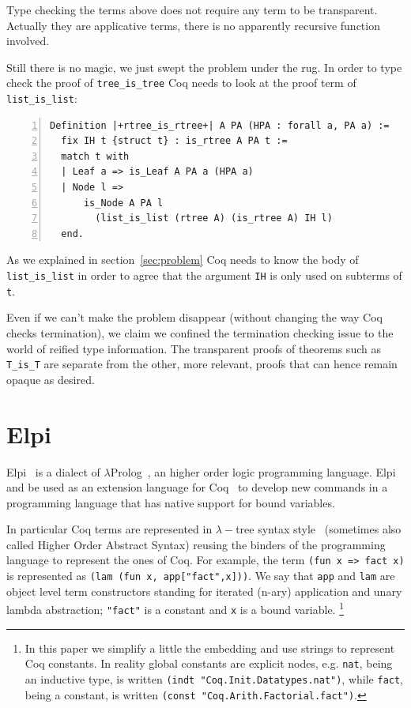 \documentclass[sigplan,10pt,review]{acmart}\settopmatter{printfolios=true,printccs=false,printacmref=false}
\begin{document}
Type checking the terms above does not require any term to be
transparent. Actually they are applicative terms, there is no
apparently recursive function involved.

Still there is no magic, we just swept the problem under the rug.
In order to type check the proof
of \lstinline+tree_is_tree+ Coq needs to look at the
proof term of \lstinline+list_is_list+:

\begin{minipage}{\textwidth}\begin{lstlisting}[numbers=left]
Definition |+rtree_is_rtree+| A PA (HPA : forall a, PA a) :=
  fix IH t {struct t} : is_rtree A PA t :=
  match t with
  | Leaf a => is_Leaf A PA a (HPA a)
  | Node l =>
      is_Node A PA l
        (list_is_list (rtree A) (is_rtree A) IH l)
  end.
\end{lstlisting}\end{minipage}

\noindent
As we explained in section~\ref{sec:problem} Coq needs to know the
body of  \lstinline+list_is_list+ in order to agree that the argument
\lstinline+IH+ is only used on subterms of \lstinline+t+.

Even if we can't make the problem disappear (without changing the way Coq
checks termination), we claim we confined the termination checking issue
to the world of reified type information. The transparent proofs of
theorems such as \lstinline+T_is_T+ are separate from the other, more
relevant, proofs that can hence remain opaque as desired.

\section{Elpi} %
\label{sec:elpi}

Elpi~\cite{dunchev:hal-01176856} is a dialect of
$\lambda$Prolog~\cite{miller_nadathur_2012}, an higher order logic
programming language. Elpi and be used as an extension language for
Coq~\cite{tassi:hal-01637063} to develop new commands in a programming
language that has native support for bound variables.

In particular Coq terms are represented in $\lambda-$tree syntax
style~\cite{10.1007/3-540-44957-4_16} (sometimes also called
Higher Order Abstract Syntax) reusing the binders of the programming
language to represent the ones of Coq.
For example, the
term \lstinline+(fun x => fact x)+ is represented as
\lstinline+(lam (fun x, app["fact",x]))+. 
We say that \lstinline+app+ and \lstinline+lam+ are object level term
constructors standing for iterated (n-ary) application and unary lambda
abstraction; \lstinline+"fact"+ is a constant and \lstinline+x+ is a
bound variable.  \footnote{In this paper we simplify
a little the embedding and use strings to represent Coq constants.
In reality
global constants are explicit nodes, e.g. \lstinline+nat+,
being an inductive type,
is written \lstinline+(indt "Coq.Init.Datatypes.nat")+,
while \lstinline+fact+, being a constant,
is written \lstinline+(const "Coq.Arith.Factorial.fact")+.}
\end{document}
